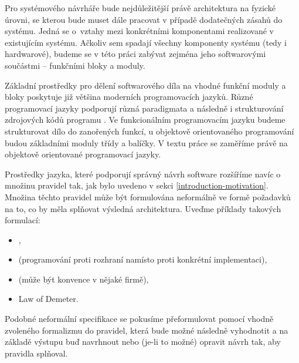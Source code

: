 Pro systémového návrháře bude nejdůležitější právě architektura na fyzické úrovni, se kterou bude muset dále pracovat v případě dodatečných zásahů do systému. Jedná se o~vztahy mezi konkrétními komponentami realizované v existujícím systému. Ačkoliv sem spadají všechny komponenty systému (tedy i hardwarové), budeme se v této práci zabývat zejména jeho softwarovými součástmi -- funkčními bloky a moduly.

Základní prostředky pro dělení softwarového díla na vhodné funkční moduly a bloky poskytuje již většina moderních programovacích jazyků. Různé programovací jazyky podporují různá paradigmata a následně i strukturování zdrojových kódů programu \cite{wiki:programming_paradigm}. Ve funkcionálním programovacím jazyku budeme strukturovat dílo do zanořených funkcí, u objektově orientovaného programování budou základními moduly třídy a balíčky. V textu práce se zaměříme právě na objektově orientované programovací jazyky.

Prostředky jazyka, které podporují správný návrh software rozšíříme navíc o množinu pravidel tak, jak bylo uvedeno v sekci \ref{introduction-motivation}. Množina těchto pravidel může být formulována neformálně ve formě požadavků na to, co by měla splňovat výsledná architektura. Uveďme příklady takových formulací:

\begin{itemize}
\item {},
\item {} (programování proti rozhraní namísto proti konkrétní implementaci),
\item {} (může být konvence v nějaké firmě),
\item Law of Demeter.
\end{itemize}

Podobné neformální specifikace se pokusíme přeformulovat pomocí vhodně zvoleného formalizmu do pravidel, která bude možné následně vyhodnotit a na základě výstupu buď navrhnout nebo (je-li to možné) opravit návrh tak, aby pravidla splňoval.

